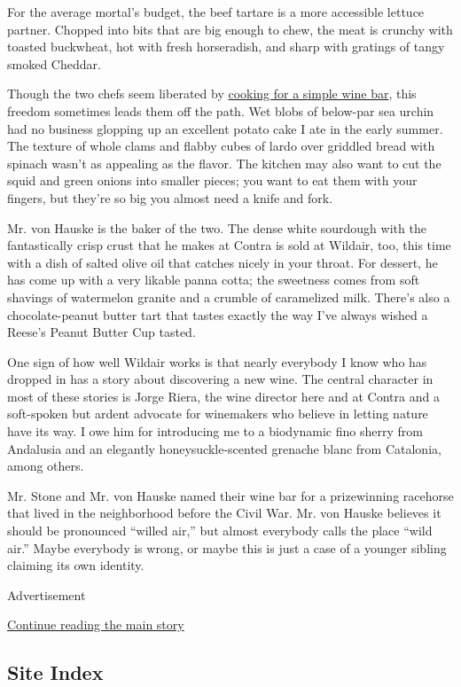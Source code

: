 For the average mortal's budget, the beef tartare is a more accessible
lettuce partner. Chopped into bits that are big enough to chew, the meat
is crunchy with toasted buckwheat, hot with fresh horseradish, and sharp
with gratings of tangy smoked Cheddar.

Though the two chefs seem liberated by
\href{http://www.nytimes3xbfgragh.onion/2015/09/09/dining/a-blurry-line-between-bar-and-restaurant.html}{cooking
for a simple wine bar}, this freedom sometimes leads them off the path.
Wet blobs of below-par sea urchin had no business glopping up an
excellent potato cake I ate in the early summer. The texture of whole
clams and flabby cubes of lardo over griddled bread with spinach wasn't
as appealing as the flavor. The kitchen may also want to cut the squid
and green onions into smaller pieces; you want to eat them with your
fingers, but they're so big you almost need a knife and fork.

Mr. von Hauske is the baker of the two. The dense white sourdough with
the fantastically crisp crust that he makes at Contra is sold at
Wildair, too, this time with a dish of salted olive oil that catches
nicely in your throat. For dessert, he has come up with a very likable
panna cotta; the sweetness comes from soft shavings of watermelon
granite and a crumble of caramelized milk. There's also a
chocolate-peanut butter tart that tastes exactly the way I've always
wished a Reese's Peanut Butter Cup tasted.

One sign of how well Wildair works is that nearly everybody I know who
has dropped in has a story about discovering a new wine. The central
character in most of these stories is Jorge Riera, the wine director
here and at Contra and a soft-spoken but ardent advocate for winemakers
who believe in letting nature have its way. I owe him for introducing me
to a biodynamic fino sherry from Andalusia and an elegantly
honeysuckle-scented grenache blanc from Catalonia, among others.

Mr. Stone and Mr. von Hauske named their wine bar for a prizewinning
racehorse that lived in the neighborhood before the Civil War. Mr. von
Hauske believes it should be pronounced ``willed air,'' but almost
everybody calls the place ``wild air.'' Maybe everybody is wrong, or
maybe this is just a case of a younger sibling claiming its own
identity.

Advertisement

\protect\hyperlink{after-bottom}{Continue reading the main story}

\hypertarget{site-index}{%
\subsection{Site Index}\label{site-index}}


